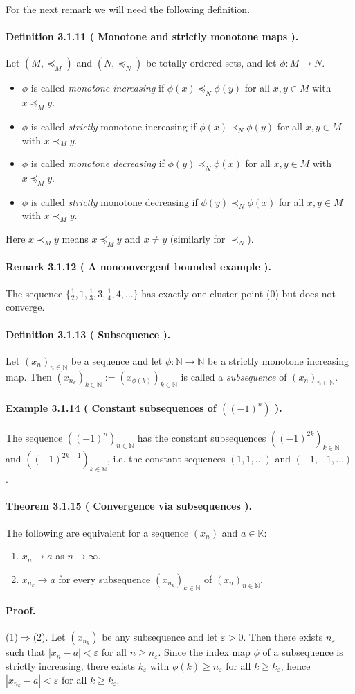 \documentclass[12pt]{article}
\newcommand{\N}{\mathbb{N}}
\newcommand{\K}{\mathbb{K}} %
\newcommand{\eps}{\varepsilon}
\newcommand{\NumberedDefinition}[3]{%
\paragraph*{Definition #1 ( #2 ).} #3\par}
\newcommand{\NumberedTheorem}[3]{%
\paragraph*{Theorem #1 ( #2 ).} #3\par}
\newcommand{\NumberedRemark}[3]{%
\paragraph*{Remark #1 ( #2 ).} #3\par}
\newcommand{\NumberedExample}[3]{%
\paragraph*{Example #1 ( #2 ).} #3\par}
\begin{document}
For the next remark we will need the following definition.

\NumberedDefinition{3.1.11}{Monotone and strictly monotone maps}{Let $(M,\preceq_M)$ and $(N,\preceq_N)$ be totally ordered sets, and let $\phi: M\to N$.
\begin{itemize}[leftmargin=*]
	\item $\phi$ is called \emph{monotone increasing} if $\phi(x)\preceq_N \phi(y)$ for all $x,y\in M$ with $x\preceq_M y$.
	\item $\phi$ is called \emph{strictly} monotone increasing if $\phi(x)\prec_N \phi(y)$ for all $x,y\in M$ with $x\prec_M y$.
	\item $\phi$ is called \emph{monotone decreasing} if $\phi(y)\preceq_N \phi(x)$ for all $x,y\in M$ with $x\preceq_M y$.
	\item $\phi$ is called \emph{strictly} monotone decreasing if $\phi(y)\prec_N \phi(x)$ for all $x,y\in M$ with $x\prec_M y$.
\end{itemize}
Here $x\prec_M y$ means $x\preceq_M y$ and $x\ne y$ (similarly for $\prec_N$).}

\NumberedRemark{3.1.12}{A nonconvergent bounded example}{The sequence $\{\tfrac12,1,\tfrac13,3,\tfrac14,4,\dots\}$ has exactly one cluster point ($0$) but does not converge.}

\NumberedDefinition{3.1.13}{Subsequence}{Let $(x_n)_{n\in\N}$ be a sequence and let $\phi: \N\to\N$ be a strictly monotone increasing map. Then $(x_{n_k})_{k\in\N}:=(x_{\phi(k)})_{k\in\N}$ is called a \emph{subsequence} of $(x_n)_{n\in\N}$.}

\NumberedExample{3.1.14}{Constant subsequences of $((-1)^n)$}{The sequence $((-1)^n)_{n\in\N}$ has the constant subsequences $((-1)^{2k})_{k\in\N}$ and $((-1)^{2k+1})_{k\in\N}$, i.e. the constant sequences $(1,1,\dots)$ and $(-1,-1,\dots)$.}

\NumberedTheorem{3.1.15}{Convergence via subsequences}{The following are equivalent for a sequence $(x_n)$ and $a\in\K$:
\begin{enumerate}[label={(\arabic*)}, leftmargin=*]
	\item $x_n\to a$ as $n\to\infty$.
	\item $x_{n_k}\to a$ for every subsequence $(x_{n_k})_{k\in\N}$ of $(x_n)_{n\in\N}$.
\end{enumerate}}

\paragraph{Proof.} (1)$\Rightarrow$(2). Let $(x_{n_k})$ be any subsequence and let $\eps>0$. Then there exists $n_\eps$ such that $|x_n-a|<\eps$ for all $n\ge n_\eps$. Since the index map $\phi$ of a subsequence is strictly increasing, there exists $k_\eps$ with $\phi(k)\ge n_\eps$ for all $k\ge k_\eps$, hence $|x_{n_k}-a|<\eps$ for all $k\ge k_\eps$.
\end{document}
